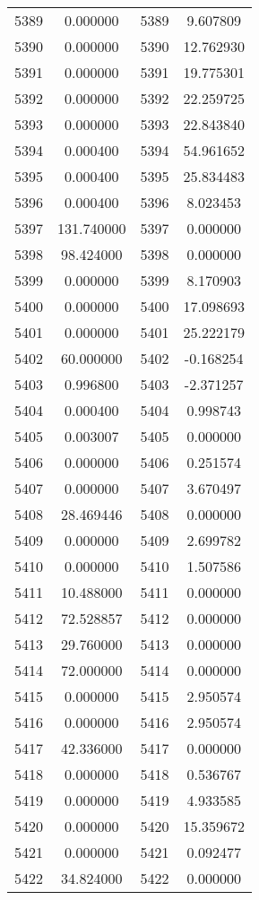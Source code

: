\documentclass[12pt]{article}
\begin{document}
\begin{longtable}{@{}cccc@{}}
5389 & 0.000000 & 5389 & 9.607809 \\
5390 & 0.000000 & 5390 & 12.762930 \\
5391 & 0.000000 & 5391 & 19.775301 \\
5392 & 0.000000 & 5392 & 22.259725 \\
5393 & 0.000000 & 5393 & 22.843840 \\
5394 & 0.000400 & 5394 & 54.961652 \\
5395 & 0.000400 & 5395 & 25.834483 \\
5396 & 0.000400 & 5396 & 8.023453 \\
5397 & 131.740000 & 5397 & 0.000000 \\
5398 & 98.424000 & 5398 & 0.000000 \\
5399 & 0.000000 & 5399 & 8.170903 \\
5400 & 0.000000 & 5400 & 17.098693 \\
5401 & 0.000000 & 5401 & 25.222179 \\
5402 & 60.000000 & 5402 & -0.168254 \\
5403 & 0.996800 & 5403 & -2.371257 \\
5404 & 0.000400 & 5404 & 0.998743 \\
5405 & 0.003007 & 5405 & 0.000000 \\
5406 & 0.000000 & 5406 & 0.251574 \\
5407 & 0.000000 & 5407 & 3.670497 \\
5408 & 28.469446 & 5408 & 0.000000 \\
5409 & 0.000000 & 5409 & 2.699782 \\
5410 & 0.000000 & 5410 & 1.507586 \\
5411 & 10.488000 & 5411 & 0.000000 \\
5412 & 72.528857 & 5412 & 0.000000 \\
5413 & 29.760000 & 5413 & 0.000000 \\
5414 & 72.000000 & 5414 & 0.000000 \\
5415 & 0.000000 & 5415 & 2.950574 \\
5416 & 0.000000 & 5416 & 2.950574 \\
5417 & 42.336000 & 5417 & 0.000000 \\
5418 & 0.000000 & 5418 & 0.536767 \\
5419 & 0.000000 & 5419 & 4.933585 \\
5420 & 0.000000 & 5420 & 15.359672 \\
5421 & 0.000000 & 5421 & 0.092477 \\
5422 & 34.824000 & 5422 & 0.000000 \\

\end{longtable}
\end{document}

